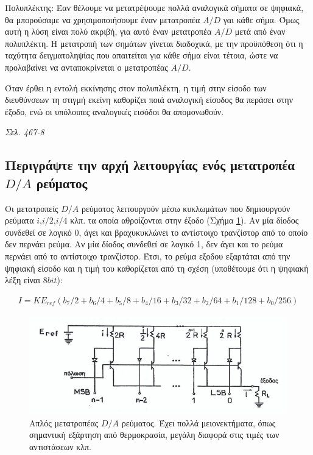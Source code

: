 \documentclass{article}
\begin{document}
Πολυπλέκτης: Έαν θέλουμε να μετατρέψουμε πολλά αναλογικά σήματα σε ψηφιακά, θα μπορούσαμε να χρησιμοποιήσουμε έναν μετατροπέα $A/D$ γαι κάθε σήμα. Όμως αυτή η λύση είναι
πολύ ακριβή, για αυτό έναν μετατροπέα $A/D$ μετά από έναν πολυπλέκτη. Η μετατροπή των σημάτων γίνεται διαδοχικά, με την προϋπόθεση ότι η ταχύτητα δειγματοληψίας που
απαιτείται για κάθε σήμα είναι τέτοια, ώστε να προλαβαίνει να ανταποκρίνεται ο μετατροπέας $A/D$.

Όταν έρθει η εντολή εκκίνησης στον πολυπλέκτη, η τιμή στην είσοδο των διευθύνσεων τη στιγμή εκείνη καθορίζει ποιά αναλογική είσοδος θα περάσει στην έξοδο, ενώ οι 
υπόλοιπες αναλογικές εισόδοι θα απομονωθούν.

\emph{Σελ. 467-8}

\subsection{Περιγράψτε την αρχή λειτουργίας ενός μετατροπέα $D/A$ ρεύματος}
Οι μετατροπείς $D/A$ ρεύματος λειτουργούν μέσω κυκλωμάτων που δημιουργούν ρεύματα $i$,$i/2$,$i/4$ κλπ. τα οποία αθροίζονται στην έξοδο (Σχήμα \ref{DArevmatos}). Αν μία δίοδος συνδεθεί σε λογικό 0, άγει και 
βραχυκυκλώνει το αντίστοιχο τρανζίστορ από το οποίο δεν περνάει ρεύμα. Αν μία δίοδος συνδεθεί σε λογικό 1, δεν άγει και το ρεύμα περνάει από το αντίστοιχο τρανζίστορ. Έτσι, το 
ρεύμα εξοδου εξαρτάται από την ψηφιακή είσοδο και η τιμή του καθορίζεται από τη σχέση (υποθέτουμε ότι η ψηφιακή λέξη είναι $8 bit$):

\begin{align*}
    I = K E_{ref} \left( b_7/2 + b_6/4 + b_5/8 + b_4/16 +b_3/32 + b_2/64 + b_1/128 + b_0/256 \right)
\end{align*}

\begin{figure}[h!]
    \includegraphics[width=\linewidth]{DArevma.png}
    \caption{Απλός μετατροπέας $D/A$ ρεύματος. Έχει πολλά μειονεκτήματα, όπως σημαντική εξάρτηση από θερμοκρασία, μεγάλη διαφορά στις τιμές των αντιστάσεων κλπ.}
    \label{DArevmatos}
\end{figure}
\end{document}

